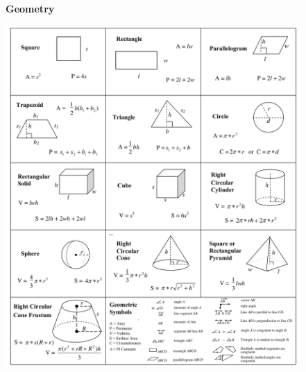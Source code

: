\documentclass[11pt,letterpaper]{article}
\begin{document}
\begin{minipage}{\textwidth}
     \noindent \textbf{Geometry}
     \begin{center}
          \includegraphics[height = 13cm]{images/geometry.png}
     \end{center}    
\end{minipage}

\vspace{15cm}
\end{document}
